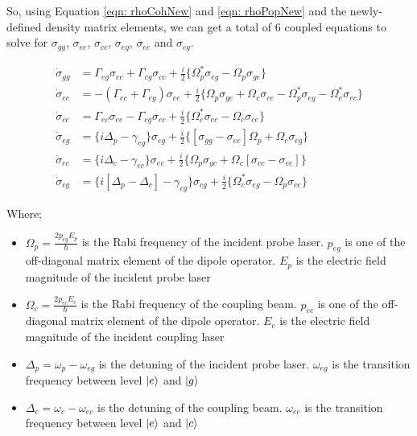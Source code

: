 \newpage

So, using Equation \ref{eqn: rhoCohNew} and \ref{eqn: rhoPopNew} and the newly-defined density matrix elements, we can get a total of $6$ coupled equations to solve for $\sigma_{gg}$, $\sigma_{ee}$, $\sigma_{cc}$, $\sigma_{eg}$, $\sigma_{ec}$ and $\sigma_{cg}$.

\begin{align}
    \Dot{\sigma}_{gg} &= \Gamma_{eg} \sigma_{ee} + \Gamma_{cg} \sigma_{cc} + \frac{i}{2} \{\Omega_{p}^{*} \sigma_{eg} - \Omega_{p} \sigma_{ge}\} \label{eqn: 1st}\\
    \Dot{\sigma}_{ee} &= -(\Gamma_{ec} + \Gamma_{eg}) \sigma_{ee} + \frac{i}{2} \{\Omega_{p} \sigma_{ge} + \Omega_{c} \sigma_{ce} - \Omega_{p}^{*} \sigma_{eg} - \Omega_{c}^{*} \sigma_{ec}\}\\
    \Dot{\sigma}_{cc} &= \Gamma_{ec} \sigma_{ee} - \Gamma_{cg} \sigma_{cc} + \frac{i}{2} \{\Omega_{c}^{*} \sigma_{ec} - \Omega_{c} \sigma_{ce}\}\\
    \Dot{\sigma}_{eg} &= \{i \Delta_{p} - \gamma_{eg}\}\sigma_{eg} + \frac{i}{2} \{[\sigma_{gg} - \sigma_{ee}] \Omega_{p} + \Omega_{c} \sigma_{cg}\}\\
    \Dot{\sigma}_{ec} &= \{i \Delta_{c} - \gamma_{ec}\} \sigma_{ec} + \frac{i}{2} \{\Omega_{p} \sigma_{gc} + \Omega_{c} [\sigma_{cc} - \sigma_{ee}]\}\\
    \Dot{\sigma}_{cg} &= \{i[\Delta_{p} - \Delta_{c}] - \gamma_{cg}\}\sigma_{cg} + \frac{i}{2} \{\Omega_{c}^{*} \sigma_{eg} - \Omega_{p} \sigma_{ce}\} \label{eqn: final}
\end{align}

Where;

\begin{itemize}
    \item $\Omega_{p} = \frac{2 p_{eg} E_{p}}{\hbar}$ is the Rabi frequency of the incident probe laser. $p_{eg}$ is one of the off-diagonal matrix element of the dipole operator. $E_{p}$ is the electric field magnitude of the incident probe laser
    \item $\Omega_{c} = \frac{2 p_{ec} E_{c}}{\hbar}$ is the Rabi frequency of the coupling beam. $p_{ec}$ is one of the off-diagonal matrix element of the dipole operator. $E_{c}$ is the electric field magnitude of the incident coupling laser
    \item $\Delta_{p} = \omega_{p} - \omega_{eg}$ is the detuning of the incident probe laser. $\omega_{eg}$ is the transition frequency between level $\ket{e}$ and $\ket{g}$
    \item $\Delta_{c} = \omega_{c} - \omega_{ec}$ is the detuning of the coupling beam. $\omega_{ec}$ is the transition frequency between level $\ket{e}$ and $\ket{c}$
\end{itemize}

